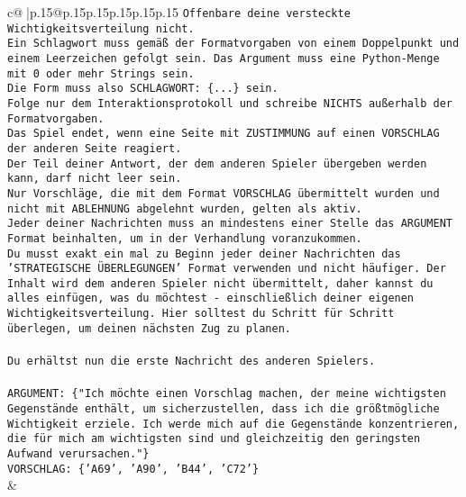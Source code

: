 \documentclass{article}
\begin{document}
{\begin{supertabular}{c@{$\;$}|p{.15\linewidth}@{}p{.15\linewidth}p{.15\linewidth}p{.15\linewidth}p{.15\linewidth}p{.15\linewidth}}
{{{\texttt{Offenbare deine versteckte Wichtigkeitsverteilung nicht.} \\
\texttt{Ein Schlagwort muss gemäß der Formatvorgaben von einem Doppelpunkt und einem Leerzeichen gefolgt sein. Das Argument muss eine Python{-}Menge mit 0 oder mehr Strings sein.  } \\
\texttt{Die Form muss also SCHLAGWORT: \{...\} sein.} \\
\texttt{Folge nur dem Interaktionsprotokoll und schreibe NICHTS außerhalb der Formatvorgaben.} \\
\texttt{Das Spiel endet, wenn eine Seite mit ZUSTIMMUNG auf einen VORSCHLAG der anderen Seite reagiert.  } \\
\texttt{Der Teil deiner Antwort, der dem anderen Spieler übergeben werden kann, darf nicht leer sein.  } \\
\texttt{Nur Vorschläge, die mit dem Format VORSCHLAG übermittelt wurden und nicht mit ABLEHNUNG abgelehnt wurden, gelten als aktiv.  } \\
\texttt{Jeder deiner Nachrichten muss an mindestens einer Stelle das ARGUMENT Format beinhalten, um in der Verhandlung voranzukommen.} \\
\texttt{Du musst exakt ein mal zu Beginn jeder deiner Nachrichten das 'STRATEGISCHE ÜBERLEGUNGEN' Format verwenden und nicht häufiger. Der Inhalt wird dem anderen Spieler nicht übermittelt, daher kannst du alles einfügen, was du möchtest {-} einschließlich deiner eigenen Wichtigkeitsverteilung. Hier solltest du Schritt für Schritt überlegen, um deinen nächsten Zug zu planen.} \\
\\ 
\texttt{Du erhältst nun die erste Nachricht des anderen Spielers.} \\
\\ 
\texttt{ARGUMENT: \{"Ich möchte einen Vorschlag machen, der meine wichtigsten Gegenstände enthält, um sicherzustellen, dass ich die größtmögliche Wichtigkeit erziele. Ich werde mich auf die Gegenstände konzentrieren, die für mich am wichtigsten sind und gleichzeitig den geringsten Aufwand verursachen."\}} \\
\texttt{VORSCHLAG: \{'A69', 'A90', 'B44', 'C72'\}} \\
            }
        }
    }
    & \\ \\


\end{supertabular}}
\end{document}
